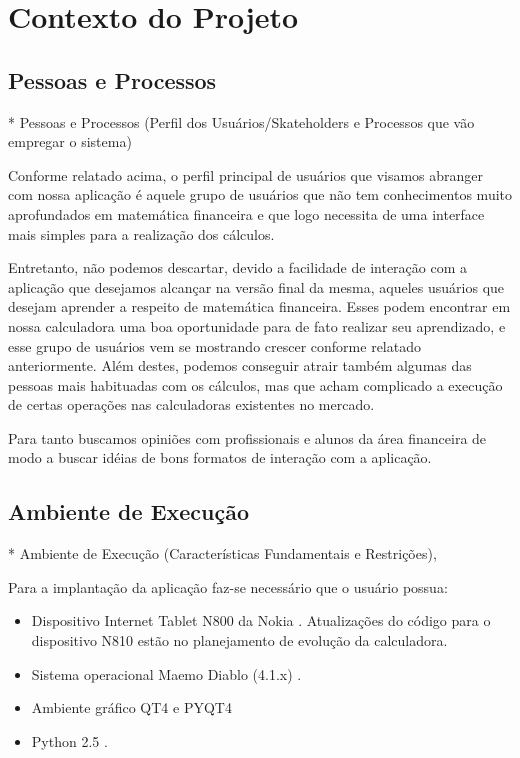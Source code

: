 \section{Contexto do Projeto}

\subsection{Pessoas e Processos}
* Pessoas e Processos (Perfil dos Usuários/Skateholders e Processos que vão empregar o sistema)

Conforme relatado acima, o perfil principal de usuários que visamos abranger com nossa aplicação é aquele grupo de usuários que não tem conhecimentos muito aprofundados em matemática financeira e que logo necessita de uma interface mais simples para a realização dos cálculos.

Entretanto, não podemos descartar, devido a facilidade de interação com a aplicação que desejamos alcançar na versão final da mesma, aqueles usuários que desejam aprender a respeito de matemática financeira. Esses podem encontrar em nossa calculadora uma boa oportunidade para de fato realizar seu aprendizado, e esse grupo de usuários vem se mostrando crescer conforme relatado anteriormente. Além destes, podemos conseguir atrair também algumas das pessoas mais habituadas com os cálculos, mas que acham complicado a execução de certas operações nas calculadoras existentes no mercado.

Para tanto buscamos opiniões com profissionais e alunos da área financeira de modo a buscar idéias de bons formatos de interação com a aplicação.


\subsection{Ambiente de Execução}

* Ambiente de Execução (Características Fundamentais e Restrições),

Para a implantação da aplicação faz-se necessário que o usuário possua:

\begin{itemize}
 \item Dispositivo Internet Tablet N800 da Nokia \cite{n800}. Atualizações do código para o dispositivo N810 estão no planejamento de evolução da calculadora.
 \item Sistema operacional Maemo Diablo (4.1.x) \cite{diablo}.
 \item Ambiente gráfico QT4 \cite{qt4} e PYQT4 \cite{pyqt4}
 \item Python 2.5 \cite{python}.
\end{itemize}


